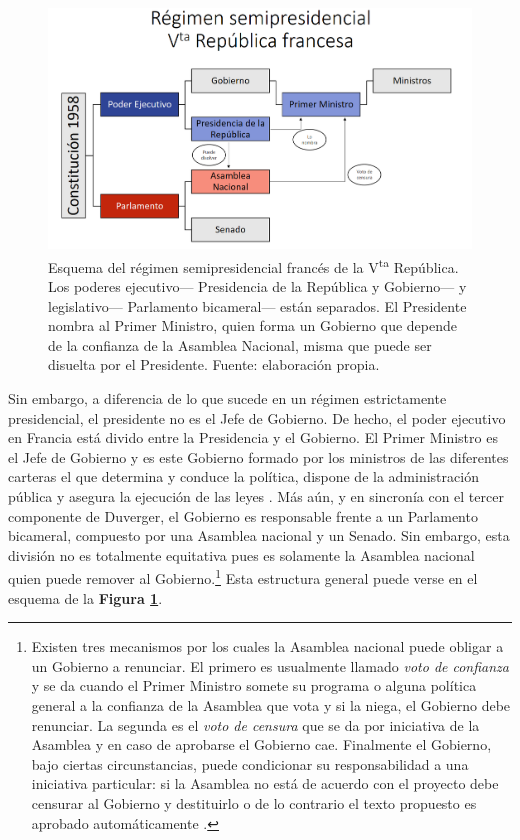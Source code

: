 \begin{figure}[h]
	\centering
	\includegraphics[scale=0.25]{Figs/FN_Francia/RegSemiPresFrVta}
	\caption{Esquema del régimen semipresidencial francés de la V\textsuperscript{ta} República. Los poderes ejecutivo--- Presidencia de la República y Gobierno--- y legislativo--- Parlamento bicameral--- están separados. El Presidente nombra al Primer Ministro, quien forma un Gobierno que depende de la confianza de la Asamblea Nacional, misma que puede ser disuelta por el Presidente. Fuente: elaboración propia.}
	\label{fig:Regimen_Semipresidencial_VRepFr}	
\end{figure}

Sin embargo, a diferencia de lo que sucede en un régimen estrictamente presidencial, el presidente no es el Jefe de Gobierno. De hecho, el poder ejecutivo en Francia está divido entre la Presidencia y el Gobierno. El Primer Ministro es el Jefe de Gobierno y es este Gobierno formado por los ministros de las diferentes carteras el que determina y conduce la política, dispone de la administración pública y asegura la ejecución de las leyes \parencite[título III]{ConstFr}. Más aún, y en sincronía con el tercer componente de Duverger, el Gobierno es responsable frente a un Parlamento bicameral, compuesto por una Asamblea nacional y un Senado. Sin embargo, esta división no es totalmente equitativa pues es solamente la Asamblea nacional quien puede remover al Gobierno.\footnote{Existen tres mecanismos por los cuales la Asamblea nacional puede obligar a un Gobierno a renunciar. El primero es usualmente llamado \textit{voto de confianza} y se da cuando el Primer Ministro somete su programa o alguna política general a la confianza de la Asamblea que vota y si la niega, el Gobierno debe renunciar. La segunda es el \textit{voto de censura} que se da por iniciativa de la Asamblea y en caso de aprobarse el Gobierno cae. Finalmente el Gobierno, bajo ciertas circunstancias, puede condicionar su responsabilidad a una iniciativa particular: si la Asamblea no está de acuerdo con el proyecto debe censurar al Gobierno y destituirlo o de lo contrario el texto propuesto es aprobado automáticamente \parencite{AN17c}.} Esta estructura general puede verse en el esquema de la \textbf{Figura \ref{fig:Regimen_Semipresidencial_VRepFr}}.\\ 

